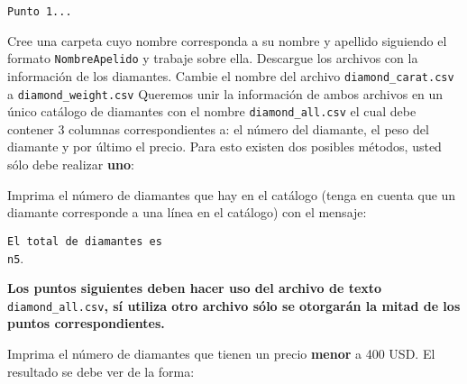 \documentclass[letterpaper,10pt,onecolumn]{exam}
\begin{document}
\centering \verb|Punto 1...|\\[0.7cm]

\begin{questions}
	\question[5] Cree una carpeta cuyo nombre corresponda a su nombre y apellido siguiendo el formato \verb|NombreApelido| y trabaje sobre ella.
	\question[10] Descargue los archivos con la información de los diamantes.
	\question[10] Cambie el nombre del archivo \verb|diamond_carat.csv| a \verb|diamond_weight.csv|
	\question[10] Queremos unir la información de ambos archivos en un único catálogo de diamantes con el nombre \verb|diamond_all.csv| el cual debe contener 3 columnas correspondientes a: el número del diamante, el peso del diamante y por último el precio. Para esto existen dos posibles métodos, usted sólo debe realizar \textbf{uno}:
	


	\question[10] Imprima el número de diamantes que hay en el catálogo (tenga en cuenta que un diamante corresponde a una línea en el catálogo) con el mensaje:
	 
		\verb|El total de diamantes es|\\
	 	\verb|n5|.\\[0.3cm]
	
	\pagebreak
	
	\textbf{Los puntos siguientes deben hacer uso del archivo de texto} \verb|diamond_all.csv|\textbf{, sí utiliza otro archivo sólo se otorgarán la mitad de los puntos correspondientes.}
	
	\question[10] Imprima el número de diamantes que tienen un precio \textbf{menor} a 400 USD. El resultado se debe ver de la forma:


\end{questions}
\end{document}

